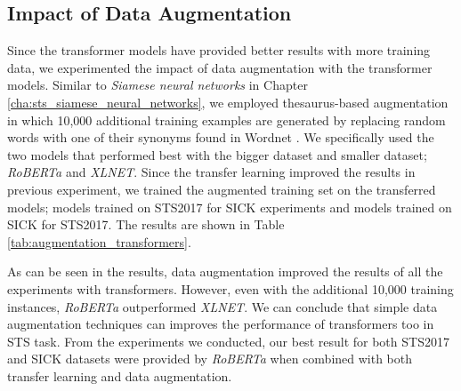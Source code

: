\subsection{Impact of Data Augmentation}
\label{sec:transformer_aug}
Since the transformer models have provided better results with more training data, we experimented the impact of data augmentation with the transformer models. Similar to \textit{Siamese neural networks} in Chapter \ref{cha:sts_siamese_neural_networks}, we employed thesaurus-based augmentation in which 10,000 additional training examples are generated by replacing random words with one of their synonyms found in Wordnet \autocite{10.1145/219717.219748}. We specifically used the two models that performed best with the bigger dataset and smaller dataset; \textit{RoBERTa} and \textit{XLNET}. Since the transfer learning improved the results in previous experiment, we trained the augmented training set on the transferred models; models trained on STS2017 for SICK experiments and models trained on SICK for STS2017. The results are shown in Table \ref{tab:augmentation_transformers}. 

\begin{table}[htb]
	\centering
	\caption[Results for data augmentation with Transformers]{Results for data augmentation with different Transformers. For each data augmentation experiment we show the difference between with dat augmentation and without data augmentation. We only report the Pearson correlation ($\bm{\rho}$) due to ease of visualisation.}  
	\label{tab:augmentation_transformers}
\end{table}

As can be seen in the results, data augmentation improved the results of all the experiments with transformers. However, even with the additional 10,000 training instances, \textit{RoBERTa} outperformed \textit{XLNET}. We can conclude that simple data augmentation techniques can improves the performance of transformers too in STS task. From the experiments we conducted, our best result for both STS2017 and SICK datasets were provided by \textit{RoBERTa} when combined with both transfer learning and data augmentation.


